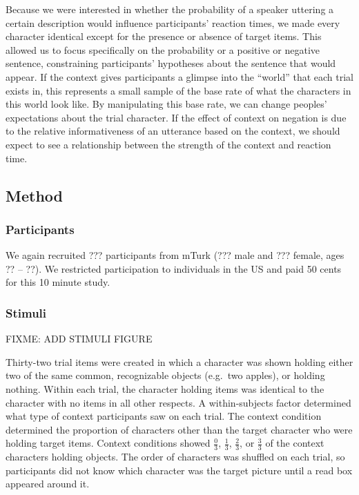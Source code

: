 \documentclass[man]{apa2}
\begin{document}
Because we were interested in whether the probability of a speaker uttering a certain description would influence participants' reaction times, we made every character identical except for the presence or absence of target items.  This allowed us to focus specifically on the probability or a positive or negative sentence, constraining participants' hypotheses about the sentence that would appear.  If the context gives participants a glimpse into the ``world'' that each trial exists in, this represents a small sample of the base rate of what the characters in this world look like.  By manipulating this base rate, we can change peoples' expectations about the trial character.  If the effect of context on negation is due to the relative informativeness of an utterance based on the context, we should expect to see a relationship between the strength of the context and reaction time. 

\subsection{Method}

\subsubsection{Participants} 

We again recruited ??? participants from mTurk (??? male and ??? female, ages ?? -- ??). We restricted participation to individuals in the US and paid 50 cents for this 10 minute study.  

\subsubsection{Stimuli}

FIXME: ADD STIMULI FIGURE

Thirty-two trial items were created in which a character was shown holding either two of the same common, recognizable objects (e.g.\ two apples), or holding nothing.  Within each trial, the character holding items was identical to the character with no items in all other respects.  A within-subjects factor determined what type of context participants saw on each trial.  The context condition determined the proportion of characters other than the target character who were holding target items.  Context conditions showed $\frac{0}{3}$, $\frac{1}{3}$, $\frac{2}{3}$, or $\frac{3}{3}$ of the context characters holding objects. The order of characters was shuffled on each trial, so participants did not know which character was the target picture until a read box appeared around it.  
\end{document}
